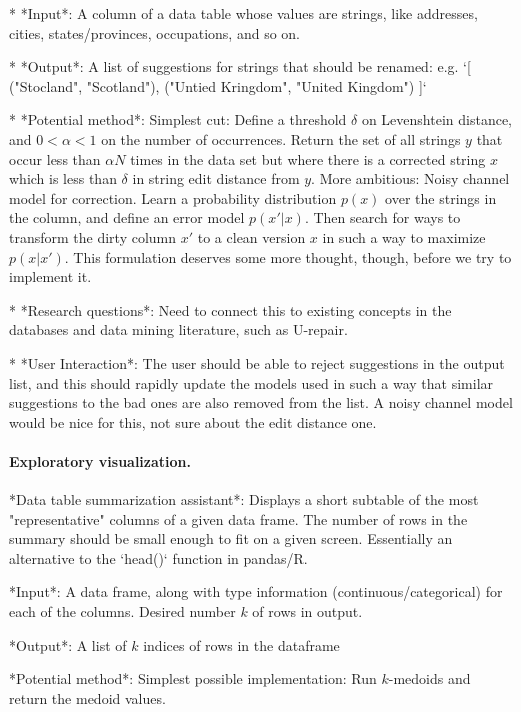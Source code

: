 \documentclass[sigplan,preprint,10pt]{acmart}\settopmatter{printfolios=true,printccs=false,printacmref=false}
\theoremstyle{plain}
\theoremstyle{definition}
\begin{document}
{* *Input*: A column of a data table whose values are strings, like addresses, cities, states/provinces, occupations, and so on. 

* *Output*: A list of suggestions for strings that should be renamed: e.g. `[ ("Stocland", "Scotland"), ("Untied Kringdom", "United Kingdom") ]`

* *Potential method*: Simplest cut: Define a threshold $\delta$ on Levenshtein distance,
and $0 < \alpha < 1$ on the number of occurrences. Return the set of all strings $y$ that
occur less than $\alpha N$ times in the data set but where there is a corrected string $x$ which is less than $\delta$ in string edit distance from $y$.
More ambitious: Noisy channel model for correction.
Learn a probability distribution $p(x)$ over the strings in the column,
and  define an error model $p(x'|x)$. Then search for ways to transform the  dirty column $x'$  to a clean version $x$ in such a way to maximize $p(x|x')$.
This formulation deserves some more thought,
though, before we try to implement it.

* *Research questions*: Need to connect this to existing concepts in the databases and
data mining literature, such as U-repair.

* *User Interaction*: The user should be able to reject suggestions in the output list,
and this should rapidly update the models used in such a way that similar suggestions
to the bad ones are also removed from the list. A noisy channel model would be nice
for this, not sure about the edit distance one.

\paragraph{Exploratory visualization.}

*Data table summarization assistant*: Displays a short subtable of the most "representative"
columns of a given data frame. The number of rows in the summary should be small enough
to fit on a given screen. Essentially an alternative to the `head()` function in pandas/R.

*Input*:  A data frame, along with type information (continuous/categorical) for each of the columns. Desired number $k$ of rows in output. 

*Output*: A list of $k$ indices of rows in the dataframe

*Potential method*:  Simplest possible implementation:
Run $k$-medoids and return the medoid values.

}
\end{document}

